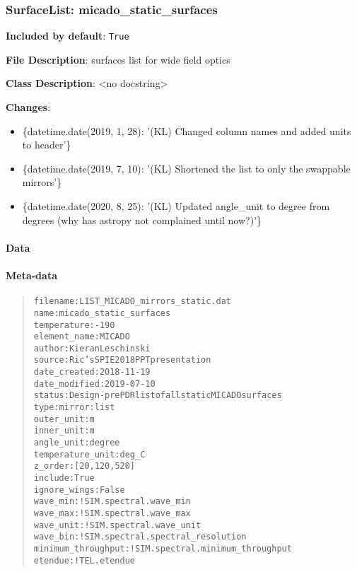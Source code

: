 \subsubsection{SurfaceList: \textquotedbl{}micado\_static\_surfaces\textquotedbl{}%
  \label{surfacelist-micado-static-surfaces}%
}

\textbf{Included by default}: \texttt{True}

\textbf{File Description}: surfaces list for wide field optics

\textbf{Class Description}: <no docstring>

\textbf{Changes}:

\begin{itemize}
\item \{datetime.date(2019, 1, 28): '(KL) Changed column names and added units to header'\}

\item \{datetime.date(2019, 7, 10): '(KL) Shortened the list to only the swappable mirrors'\}

\item \{datetime.date(2020, 8, 25): '(KL) Updated angle\_unit to degree from degrees (why has astropy not complained until now?)'\}
\end{itemize}


\paragraph{Data%
  \label{data}%
}


\paragraph{Meta-data%
  \label{meta-data}%
}

\begin{quote}
\begin{alltt}
          filename : LIST_MICADO_mirrors_static.dat
              name : micado_static_surfaces
       temperature : -190
      element_name : MICADO
            author : Kieran Leschinski
            source : Ric's SPIE 2018 PPT presentation
      date_created : 2018-11-19
     date_modified : 2019-07-10
            status : Design - pre PDR list of all static MICADO surfaces
              type : mirror:list
        outer_unit : m
        inner_unit : m
        angle_unit : degree
  temperature_unit : deg_C
           z_order : [20, 120, 520]
           include : True
      ignore_wings : False
          wave_min : !SIM.spectral.wave_min
          wave_max : !SIM.spectral.wave_max
         wave_unit : !SIM.spectral.wave_unit
          wave_bin : !SIM.spectral.spectral_resolution
minimum_throughput : !SIM.spectral.minimum_throughput
           etendue : !TEL.etendue
\end{alltt}
\end{quote}



